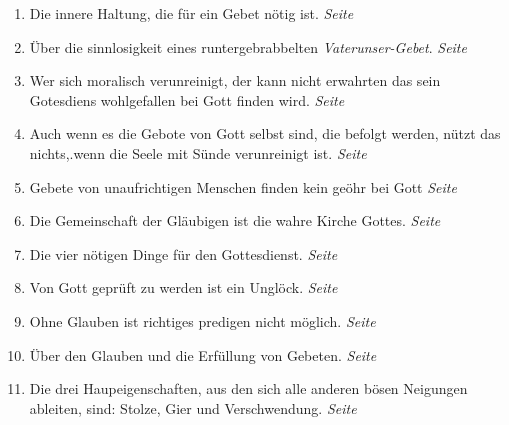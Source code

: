 \begin{enumerate}
 \item Die innere Haltung, die für ein Gebet nötig ist.
 \dotfill \textit{Seite \pageref{ref:06_04_gebetshaltung}}\\
 
 \item Über die sinnlosigkeit eines runtergebrabbelten
\textit{Vaterunser-Gebet}.
 \dotfill \textit{Seite \pageref{ref:06_07_sinnlose_gebete}}\\
 
 \item Wer sich moralisch verunreinigt, der kann nicht erwahrten das sein
Gotesdiens wohlgefallen bei Gott finden wird.
 \dotfill \textit{Seite
\pageref{ref:06_08_moralisch_verunreinigt}}\\

 \item Auch wenn es die Gebote von Gott selbst sind, die befolgt werden, nützt
das nichts,.wenn die Seele mit Sünde verunreinigt ist.
 \dotfill \textit{Seite \pageref{ref:06_09_gottesregeln}}\\
 
 \item Gebete von unaufrichtigen Menschen finden kein geöhr bei Gott
 \dotfill \textit{Seite \pageref{ref:06_09_gebetserhoerung}}\\
 
 \item Die Gemeinschaft der Gläubigen ist die wahre Kirche Gottes.
 \dotfill \textit{Seite \pageref{ref:06_12_wahre_kirche}}\\
 
 \item Die vier nötigen Dinge für den Gottesdienst.
 \dotfill \textit{Seite
\pageref{ref:06_13_vier_noetige_dinge}}\\

 \item Von Gott geprüft zu werden ist ein Unglöck.
 \dotfill \textit{Seite
\pageref{ref:06_13_auf_die_probe_gestellt}}\\

 \item Ohne Glauben ist richtiges predigen nicht möglich.
 \dotfill \textit{Seite \pageref{ref:06_14_predigt}}\\
 
 \item Über den Glauben und die Erfüllung von Gebeten.
 \dotfill \textit{Seite \pageref{ref:06_14_gebetserfuellung}}\\
 
 \item Die drei Haupeigenschaften, aus den sich alle anderen bösen Neigungen
ableiten, sind: Stolze, Gier und Verschwendung.
 \dotfill \textit{Seite
\pageref{ref:07_01_drei_haupteigenschaften}}\\


\end{enumerate}

